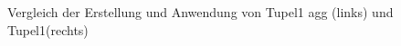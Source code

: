 \documentclass[
	12pt,
	a4paper,
	BCOR10mm,
	DIV14,
	listof=totoc,
	bibliography=totoc,
	headsepline
]{scrreprt}
\begin{document}
	\begin{figure}
		\centering
		\caption{Vergleich der Erstellung und Anwendung von Tupel1 agg (links) und Tupel1(rechts)}
		\label{fig:tupel1vstupel1agg}
	\end{figure} 
\end{document}
